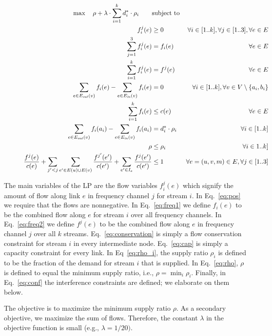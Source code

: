 \documentclass[12pt]{article}
\newenvironment{proof sketch}[1]{\noindent {\emph{Proof sketch of #1:}}}{\hfill \qed}
\newcommand{\Ein}{E_{\text{\emph{in}}}}
\newcommand{\Eout}{E_{\text{\emph{out}}}}
\begin{document}
\begin{figure}
  \begin{align}
    \max ~~~\rho + \lambda \cdot\sum_{i=1}^k d^*_i \cdot \rho_i~~~~~~&\text{subject to}&\\
    f^j_i(e) &\geq 0&\forall i\in [1..k], \forall j\in [1..3], \forall e\in E \label{eq:pos}\\
    \sum_{j=1}^3 f_i^j(e) &=f_i(e)& \forall e\in E\label{eq:freq1}\\
    \sum_{i=1}^k f_i^j(e) &=f^j(e)& \forall e\in E\label{eq:freq2}\\
    \sum_{e \in \Eout (v)} f_i(e) - \sum_{e \in \Ein (v)} f_i(e) &=0 &\forall i\in [1..k],\forall v\in V\setminus \{a_i,b_i\}\label{eq:conservation}\\
    \sum_{i=1}^k f_i(e) &\leq c(e) &\forall e\in E \label{eq:cap}\\
    \sum_{e \in \Eout (v)} f_i(a_i) - \sum_{e \in \Ein (v)} f_i(a_i)&=d^*_i \cdot \rho_i &\forall i\in [1..k]\label{eq:rho_i}\\
    \rho &\leq \rho_i&\forall i\in 1..k]\label{eq:rho}\\
    \frac{f^j(e)}{c(e)} + \sum_{j'< j} \sum_{e'\in E(u)\cup E(v)}
    \frac{f^{j'}(e')}{c(e')} + \sum_{e' \in I_{e}}
    \frac{f^j(e')}{c(e')} & \leq 1 & \forall e=(u,v,m)\in E,\forall
    j\in[1..3] \label{eq:conf}
  \end{align}
\end{figure}
The main variables of the LP are the flow variables $f_i^j(e)$ which
signify the amount of flow along link $e$ in frequency channel $j$
for stream $i$.  In Eq.~\ref{eq:pos} we require that the flows are
nonnegative.  In Eq.~\ref{eq:freq1} we define $f_i(e)$ to be the
combined flow along $e$ for stream $i$ over all frequency channels.  In
Eq.~\ref{eq:freq2} we define $f^j(e)$ to be the combined flow along
$e$ in frequency channel $j$ over all $k$ streams.
Eq.~\ref{eq:conservation} is simply a flow conservation constraint for
stream $i$ in every intermediate node.  Eq.~\ref{eq:cap} is simply a
capacity constraint for every link.  In Eq~\ref{eq:rho_i}, the supply
ratio $\rho_i$ is defined to be the fraction of the demand for stream $i$
that is supplied.  In Eq.~\ref{eq:rho}, $\rho$ is defined to equal the
minimum supply ratio, i.e., $\rho=\min_i \rho_i$.  Finally, in
Eq.~\ref{eq:conf} the interference constraints are defined; we
elaborate on them below.

The objective is to maximize the minimum supply ratio $\rho$.  As a
secondary objective, we maximize the sum of flows.
Therefore, the constant $\lambda$ in the objective function is small
(e.g., $\lambda=1/20)$.
\end{document}
